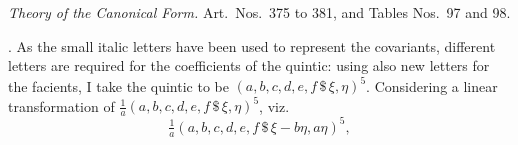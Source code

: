 \documentclass[11pt]{article}
\begin{document}
\medskip

\begin{center}
\textit{Theory of the Canonical Form.} Art.\ Nos.\ 375 to 381, and Tables Nos.\ 97 and 98.
\end{center}

\medskip

. As the small italic letters have been used to represent the covariants, different letters are required for the coefficients of the quintic: using also new letters for the facients, I take the quintic to be $(a, b, c, d, e, f\,\$\,\xi, \eta)^{5}$. Considering a linear transformation of $\tfrac{1}{a}(a, b, c, d, e, f\,\$\,\xi, \eta)^{5}$, viz.
\[
\tfrac{1}{a}(a, b, c, d, e, f\,\$\,\xi - b\eta, a\eta)^{5},
\]
\end{document}
